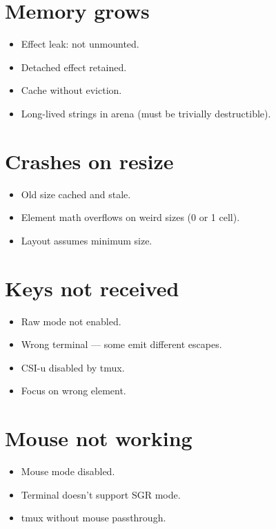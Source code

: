 \section{Memory grows}

\begin{itemize}[leftmargin=*]
  \item Effect leak: not unmounted.
  \item Detached effect retained.
  \item Cache without eviction.
  \item Long-lived strings in arena (must be trivially
    destructible).
\end{itemize}

\section{Crashes on resize}

\begin{itemize}[leftmargin=*]
  \item Old size cached and stale.
  \item Element math overflows on weird sizes (0 or 1
    cell).
  \item Layout assumes minimum size.
\end{itemize}

\section{Keys not received}

\begin{itemize}[leftmargin=*]
  \item Raw mode not enabled.
  \item Wrong terminal --- some emit different escapes.
  \item CSI-u disabled by tmux.
  \item Focus on wrong element.
\end{itemize}

\section{Mouse not working}

\begin{itemize}[leftmargin=*]
  \item Mouse mode disabled.
  \item Terminal doesn't support SGR mode.
  \item tmux without mouse passthrough.
\end{itemize}

